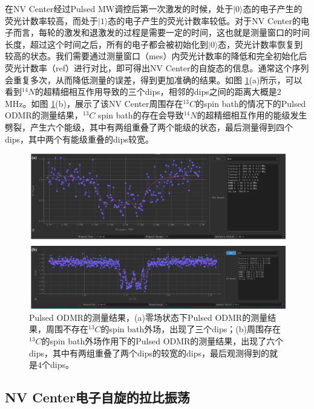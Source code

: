 \documentclass[type = bachelor]{whu-thesis}
\begin{document}
在NV Center经过Pulsed MW调控后第一次激发的时候，处于$|0\rangle$态的电子产生的荧光计数率较高，而处于$|1\rangle$态的电子产生的荧光计数率较低。对于NV Center的电子而言，每轮的激发和退激发的过程是需要一定的时间，这也就是测量窗口的时间长度，超过这个时间之后，所有的电子都会被初始化到$|0\rangle$态，荧光计数率恢复到较高的状态。我们需要通过测量窗口（mes）内荧光计数率的降低和完全初始化后荧光计数率（ref）进行对比，即可得出NV Center的自旋态的信息。通常这个序列会重复多次，从而降低测量的误差，得到更加准确的结果。如图 \ref{fig: Pulsed ODMR_results}(a)所示，可以看到$^{14}N$的超精细相互作用导致的三个dips，相邻的dips之间的距离大概是2 MHz。如图 \ref{fig: Pulsed ODMR_results}(b)，展示了该NV Center周围存在$^{13}C$的spin bath的情况下的Pulsed ODMR的测量结果，$^{13}C$ spin bath的存在会导致$^{14}N$的超精细相互作用的能级发生劈裂，产生六个能级，其中有两组重叠了两个能级的状态，最后测量得到四个dips，其中两个有能级重叠的dips较宽。

\begin{figure}
  \centering
  \includegraphics[width=1.0\textwidth]{figures/Chapter 1/Pulsed ODMR_results.png}
  \caption[Pulsed ODMR的测量结果]{Pulsed ODMR的测量结果，(a)零场状态下Pulsed ODMR的测量结果，周围不存在$^{13}C$的spin bath外场，出现了三个dips；(b)周围存在$^{13}C$的spin bath外场作用下的Pulsed ODMR的测量结果，出现了六个dips，其中有两组重叠了两个dips的较宽的dips，最后观测得到的就是4个dips。}
  \label{fig: Pulsed ODMR_results}
\end{figure}

\subsection{NV Center电子自旋的拉比振荡}
\end{document}
